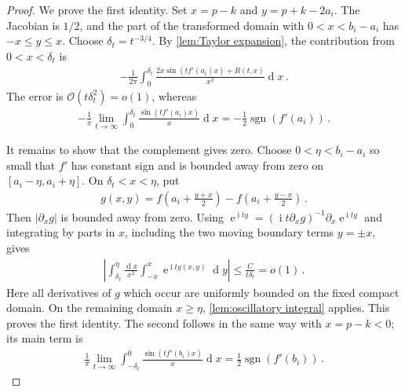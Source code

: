 \documentclass[a4paper,10pt]{article}
\numberwithin{equation}{section}
\theoremstyle{plain}
\theoremstyle{plain}
\theoremstyle{plain}
\theoremstyle{plain}
\theoremstyle{plain}
\theoremstyle{remark}
\theoremstyle{definition}
\theoremstyle{plain}
\newcommand{\ee}{\operatorname{e}}
\newcommand{\ii}{\operatorname{i}}
\newcommand{\calO}{\mathcal{O}}
\newcommand{\dif}{\operatorname{d}\!} %
\newcommand{\sgn}{\operatorname{sgn}}
\newcommand{\eq}[1]{\begin{align*}#1\end{align*}}
\begin{document}
\begin{proof}
We prove the first identity. Set $x=p-k$ and $y=p+k-2a_i$. The Jacobian is $1/2$, and the part of the transformed domain with $0<x<b_i-a_i$ has $-x\leq y\leq x$. Choose $\delta_t=t^{-3/4}$. By \cref{lem:Taylor expansion}, the contribution from $0<x<\delta_t$ is
\eq{-\frac{1}{2\pi}\int_0^{\delta_t}\frac{2x\sin(tf'(a_i)x)+R(t,x)}{x^2}\dif{x}\,.}
The error is $\calO(t\delta_t^2)=o(1)$, whereas
\eq{-\frac{1}{\pi}\lim_{t\to\infty}\int_0^{\delta_t}\frac{\sin(tf'(a_i)x)}{x}\dif{x}=-\frac{1}{2}\sgn(f'(a_i))\,.}

It remains to show that the complement gives zero. Choose $0<\eta<b_i-a_i$ so small that $f'$ has constant sign and is bounded away from zero on $[a_i-\eta,a_i+\eta]$. On $\delta_t<x<\eta$, put
\eq{g(x,y)=f\left(a_i+\frac{y+x}{2}\right)-f\left(a_i+\frac{y-x}{2}\right)\,.}
Then $|\partial_xg|$ is bounded away from zero. Using $\ee^{\ii tg}=(\ii t\partial_xg)^{-1}\partial_x\ee^{\ii tg}$ and integrating by parts in $x$, including the two moving boundary terms $y=\pm x$, gives
\eq{\left|\int_{\delta_t}^{\eta}\frac{\dif{x}}{x^2}\int_{-x}^{x}\ee^{\ii tg(x,y)}\dif{y}\right|\leq\frac{C}{t\delta_t}=o(1)\,.}
Here all derivatives of $g$ which occur are uniformly bounded on the fixed compact domain. On the remaining domain $x\geq\eta$, \cref{lem:oscillatory integral} applies. This proves the first identity. The second follows in the same way with $x=p-k<0$; its main term is
\eq{\frac{1}{\pi}\lim_{t\to\infty}\int_{-\delta_t}^{0}\frac{\sin(tf'(b_i)x)}{x}\dif{x}=\frac{1}{2}\sgn(f'(b_i))\,.}
\end{proof}
\end{document}
